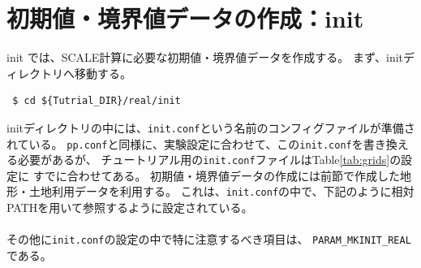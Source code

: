 
\section{初期値・境界値データの作成：init}

init では、SCALE計算に必要な初期値・境界値データを作成する。
まず、initディレクトリへ移動する。
\begin{verbatim}
 $ cd ${Tutrial_DIR}/real/init
\end{verbatim}

initディレクトリの中には、\verb|init.conf|という名前のコンフィグファイルが準備されている。
\verb|pp.conf|と同様に、実験設定に合わせて、この\verb|init.conf|を書き換える必要があるが、
チュートリアル用の\verb|init.conf|ファイルはTable\ref{tab:grids}の設定に
すでに合わせてある。
初期値・境界値データの作成には前節で作成した地形・土地利用データを利用する。
これは、\verb|init.conf|の中で、下記のように相対PATHを用いて参照するように設定されている。\\

\\

\noindent その他に\verb|init.conf|の設定の中で特に注意するべき項目は、
\verb|PARAM_MKINIT_REAL|である。\\

